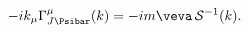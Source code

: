 \begin{equation}
\label{eq:wt1_ft}
 -ik_\mu\Gamma_{J\smash[t]{\Psibar}}^\mu(k)=-im\veva\, 
 \mathcal{S}^{-1}(k).
\end{equation}

